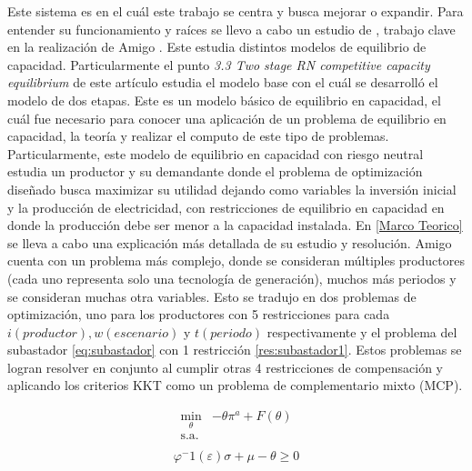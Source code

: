 Este sistema es en el cuál este trabajo se centra y busca mejorar o expandir. Para entender su funcionamiento y raíces se llevo a cabo un estudio de \cite{deMaered'Aertrycke2017}, trabajo clave en la realización de Amigo . Este estudia distintos modelos de equilibrio de capacidad. Particularmente el punto \textit{3.3 Two stage RN competitive capacity equilibrium} de este artículo estudia el modelo base con el cuál se desarrolló el modelo de dos etapas. Este es un modelo básico de equilibrio en capacidad, el cuál fue necesario para conocer una aplicación de un problema de equilibrio en capacidad, la teoría y realizar el computo de este tipo de problemas. Particularmente, este modelo de equilibrio en capacidad con riesgo neutral estudia un productor y su demandante donde el problema de optimización diseñado busca maximizar su utilidad dejando como variables la inversión inicial y la producción de electricidad, con restricciones de equilibrio en capacidad en donde la producción debe ser menor a la capacidad instalada. En \ref{Marco Teorico} se lleva a cabo una explicación más detallada de su estudio y resolución. 
\vspace{2.5mm}
Amigo cuenta con un problema más complejo, donde se consideran múltiples productores (cada uno representa solo una tecnología de generación), muchos más periodos y se consideran muchas otra variables. Esto se tradujo en dos problemas de optimización, uno para los productores con 5 restricciones para cada $i(productor), w(escenario)$ y $t(periodo)$ respectivamente y el problema del subastador \ref{eq:subastador} con 1 restricción \ref{res:subastador1}. Estos problemas se logran resolver en conjunto al cumplir otras 4 restricciones de compensación y aplicando los criterios KKT como un problema de complementario mixto (MCP). 

\begin{equation}
\begin{array}{rrclcl}
    \displaystyle \min_{\theta} &-\theta \pi^a + F(\theta) \\\textrm{s.a.} \label{eq:subastador}\\
\end{array}
\end{equation}
\begin{equation}
\begin{array}{cl}
    \varphi^-1 (\varepsilon )\sigma + \mu - \theta \geq 0 \label{res:subastador1}
\end{array}
\end{equation}

